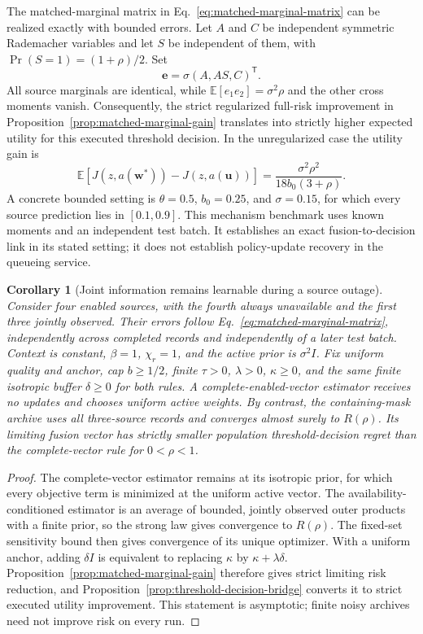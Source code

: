 \documentclass[10pt]{article}
\newtheorem{corollary}{Corollary}
\begin{document}
The matched-marginal matrix in Eq.~\eqref{eq:matched-marginal-matrix} can
be realized exactly with bounded errors. Let $A$ and $C$ be independent
symmetric Rademacher variables and let $S$ be independent of them, with
$\Pr(S=1)=(1+\rho)/2$. Set
\begin{equation}
 \boldsymbol e=\sigma(A,AS,C)^{\mathsf T}.
\end{equation}
All source marginals are identical, while
$\mathbb E[e_1e_2]=\sigma^2\rho$ and the other cross moments vanish.
Consequently, the strict regularized full-risk improvement in
Proposition~\ref{prop:matched-marginal-gain} translates into strictly
higher expected utility for this executed threshold decision. In the
unregularized case the utility gain is
\begin{equation}
 \mathbb E[J(z,a(\boldsymbol w^*))-J(z,a(\boldsymbol u))]
 =\frac{\sigma^2\rho^2}{18b_0(3+\rho)}.
\end{equation}
A concrete bounded setting is $\theta=0.5$, $b_0=0.25$, and
$\sigma=0.15$, for which every source prediction lies in $[0.1,0.9]$.
This mechanism benchmark uses known moments and an independent test batch.
It establishes an exact fusion-to-decision link in its stated setting;
it does not establish policy-update recovery in the queueing service.


\begin{corollary}[Joint information remains learnable during a source outage]
\label{cor:outage-joint-information}
Consider four enabled sources, with the fourth always unavailable and the first
three jointly observed. Their errors follow
Eq.~\eqref{eq:matched-marginal-matrix}, independently across completed records
and independently of a later test batch. Context is constant, $\beta=1$,
$\chi_r=1$, and the active prior is $\sigma^2I$. Fix uniform quality and anchor,
cap $b\ge1/2$, finite $\tau>0$, $\lambda>0$, $\kappa\ge0$, and the same finite
isotropic buffer $\delta\ge0$ for both rules. A complete-enabled-vector estimator
receives no updates and chooses uniform active weights. By contrast, the
containing-mask archive uses all three-source records and converges almost surely
to $R(\rho)$. Its limiting fusion vector has strictly smaller population
threshold-decision regret than the complete-vector rule for $0<\rho<1$.
\end{corollary}
\begin{proof}
The complete-vector estimator remains at its isotropic prior, for which every
objective term is minimized at the uniform active vector. The availability-
conditioned estimator is an average of bounded, jointly observed outer products
with a finite prior, so the strong law gives convergence to $R(\rho)$.
The fixed-set sensitivity bound then gives convergence of its unique optimizer.
With a uniform anchor, adding $\delta I$ is equivalent to replacing $\kappa$
by $\kappa+\lambda\delta$. Proposition~\ref{prop:matched-marginal-gain}
therefore gives strict limiting risk reduction, and
Proposition~\ref{prop:threshold-decision-bridge} converts it to strict executed
utility improvement. This statement is asymptotic; finite noisy archives need
not improve risk on every run.
\end{proof}
\end{document}
